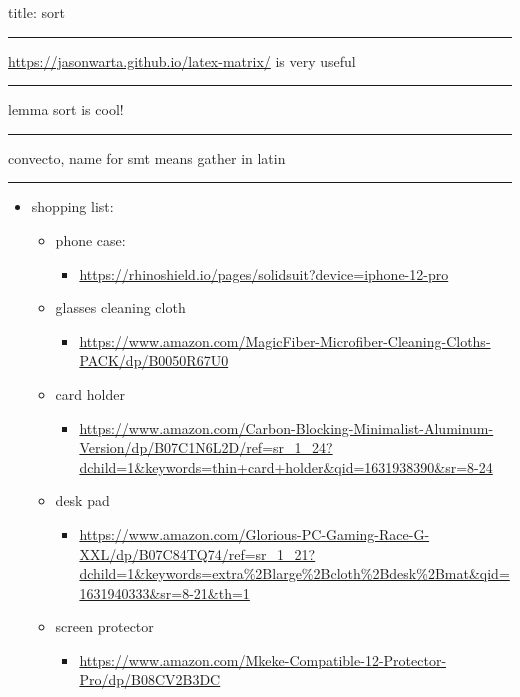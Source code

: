 \documentclass[letterpaper]{article}
\date{\today}
\title{}
\begin{document}
title: sort

\noindent\rule{\textwidth}{0.5pt}

\url{https://jasonwarta.github.io/latex-matrix/} is very useful

\noindent\rule{\textwidth}{0.5pt}

lemma sort is cool!

\noindent\rule{\textwidth}{0.5pt}

convecto, name for smt means gather in latin

\noindent\rule{\textwidth}{0.5pt}

\begin{itemize}
\item shopping list:

\begin{itemize}
\item phone case:

\begin{itemize}
\item \url{https://rhinoshield.io/pages/solidsuit?device=iphone-12-pro}
\end{itemize}

\item glasses cleaning cloth

\begin{itemize}
\item \url{https://www.amazon.com/MagicFiber-Microfiber-Cleaning-Cloths-PACK/dp/B0050R67U0}
\end{itemize}

\item card holder

\begin{itemize}
\item \url{https://www.amazon.com/Carbon-Blocking-Minimalist-Aluminum-Version/dp/B07C1N6L2D/ref=sr\_1\_24?dchild=1\&keywords=thin+card+holder\&qid=1631938390\&sr=8-24}
\end{itemize}

\item desk pad

\begin{itemize}
\item \url{https://www.amazon.com/Glorious-PC-Gaming-Race-G-XXL/dp/B07C84TQ74/ref=sr\_1\_21?dchild=1\&keywords=extra\%2Blarge\%2Bcloth\%2Bdesk\%2Bmat\&qid=1631940333\&sr=8-21\&th=1}
\end{itemize}

\item screen protector

\begin{itemize}
\item \url{https://www.amazon.com/Mkeke-Compatible-12-Protector-Pro/dp/B08CV2B3DC}
\end{itemize}
\end{itemize}
\end{itemize}
\end{document}
